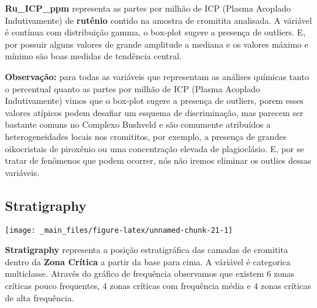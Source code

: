 \documentclass[
]{article}
\begin{document}
\textbf{Ru\_ICP\_ppm} representa as partes por milhão de ICP (Plasma Acoplado Indutivamente) de \textbf{ruténio} contido na amostra de cromitita analisada. A váriável é contínua com distribuição gamma, o box-plot sugere a presença de outliers. E, por possuir alguns valores de grande amplitude a mediana e os valores máximo e mínimo são boas medidas de tendência central.

\textbf{Observação:} para todas as variáveis que representam as análises químicas tanto o percentual quanto as partes por milhão de ICP (Plasma Acoplado Indutivamente) vimos que o box-plot sugere a presença de outliers, porem esses valores atípicos podem desafiar um esquema de discriminação, mas parecem ser bastante comuns no Complexo Bushveld e são comumente atribuídos a heterogeneidades locais nos cromititos, por exemplo, a presença de grandes oikocristais de piroxênio ou uma concentração elevada de plagioclásio. E, por se tratar de fenômenos que podem ocorrer, nós não iremos eliminar os outlies dessas variáveis.

\hypertarget{stratigraphy}{%
\subsection{Stratigraphy}\label{stratigraphy}}

\begin{center}\texttt{[image: \_main\_files/figure-latex/unnamed-chunk-21-1]} \end{center}

\textbf{Stratigraphy} representa a posição estratigráfica das camadas de cromitita dentro da \textbf{Zona Crítica} a partir da base para cima. A váriável é categorica multiclasse. Através do gráfico de frequência observamos que existem 6 zonas críticas pouco frequentes, 4 zonas críticas com frequência média e 4 zonas críticas de alta frequência.

\newpage
\end{document}
